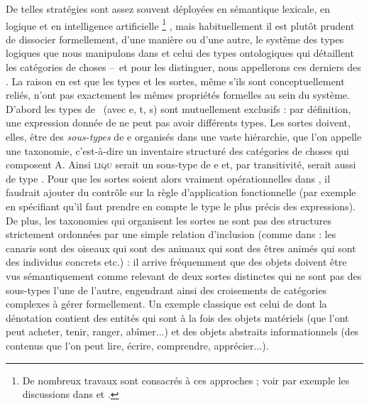 \largerpage[-1]

De telles stratégies sont assez souvent déployées en sémantique lexicale, 
en logique et en intelligence artificielle%
\footnote{De nombreux travaux sont consacrés à ces approches ; voir par exemple les discussions dans  \citet{Pust:95} et \citet{Asher:11}.\label{fn:GL-WoW}}%
, mais habituellement il est plutôt prudent de dissocier formellement, d'une manière ou d'une autre, le système des types logiques que nous manipulons dans {\LO} et celui des types ontologiques qui détaillent les catégories de choses --~et pour les distinguer, nous appellerons ces derniers des .  
La raison en est que les types et les sortes, même s'ils sont conceptuellement reliés,  n'ont pas exactement les mêmes propriétés formelles au sein du système. 
D'abord les types de \Types\ (avec \typ e, \typ t, \typ s) sont mutuellement exclusifs : par définition, une expression donnée de {\LO} ne peut pas avoir différents types.  Les sortes doivent, elles, être des \emph{sous-types} de \typ e organisés dans une vaste hiérarchie, que l'on appelle une taxonomie, c'est-à-dire un inventaire structuré des catégories de choses qui composent \Unv A.  Ainsi \textsc{liqu} serait un sous-type de \typ e et, par transitivité,  serait aussi de type \eet.  Pour que les sortes soient alors vraiment opérationnelles dans \LO, il faudrait ajouter du contrôle sur la règle d'application fonctionnelle (par exemple en spécifiant qu'il faut prendre en compte le type le plus précis des expressions).   De plus, les taxonomies qui organisent les sortes ne sont pas des structures strictement ordonnées par une simple relation d'inclusion (comme dans : les canaris sont des oiseaux qui sont des animaux qui sont des êtres animés qui sont des individus concrets etc.) : il arrive fréquemment que des objets doivent être vus sémantiquement comme relevant de deux sortes distinctes qui ne sont pas des sous-types l'une de l'autre, engendrant ainsi des croisements de catégories complexes à gérer formellement.  Un exemple classique est celui de  dont la dénotation contient des entités qui sont  à la fois des objets matériels (que l'ont peut acheter, tenir, ranger, abîmer...) et des objets abstraits informationnels (des contenus que l'on peut lire, écrire, comprendre, apprécier...).  
